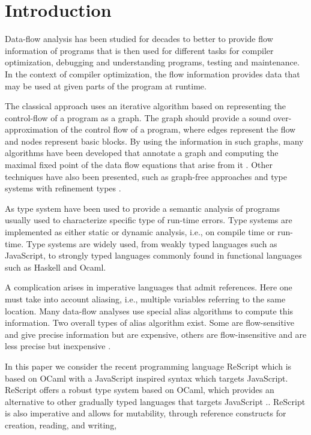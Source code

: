 \documentclass[acmsmall,sigplan]{acmart}
\begin{document}
   
	
\section{Introduction}

Data-flow analysis has been studied for decades to better to provide
flow information of programs that is then used for
different tasks for compiler optimization, debugging and understanding
programs, testing and maintenance.  In the context of compiler
optimization, the flow information provides data that may be
used at given parts of the program at runtime.

The classical approach uses an iterative algorithm based on
representing the control-flow of a program as a graph.  The graph
should provide a sound over-approximation of the control flow of a
program, where edges represent the flow and nodes represent basic
blocks.  By using the information in such graphs, many algorithms have
been developed that annotate a graph and computing the maximal fixed
point of the data flow equations that arise from it
\cite{KildallGaryA1973Auat, RyderBarbara1988Idaa}.  Other techniques
have also been presented, such as graph-free approaches
\cite{HorspoolR.Niegel2002AGAt} and type systems with refinement types
\cite{PavlinovicZvonimir2021Dfrt}.

As type system have been used to provide a semantic analysis of
programs usually used to characterize specific type of run-time
errors. Type systems are implemented as either static or dynamic
analysis, i.e., on compile time or run-time.  Type systems are widely
used, from weakly typed languages such as JavaScript, to strongly
typed languages commonly found in functional languages such as Haskell
and Ocaml.

A complication arises in imperative languages that admit
references. Here one must take into account aliasing, i.e., multiple
variables referring to the same location.  Many data-flow analyses use
special alias algorithms to compute this information.  Two overall
types of alias algorithm exist. Some are flow-sensitive and give
precise information but are expensive, others are flow-insensitive and
are less precise but inexpensive \cite{LiangDonglin1999Eaag,
  EmamiMaryam1994Cipa}.

In this paper we consider the recent programming language ReScript
which is based on OCaml with a JavaScript inspired syntax which
targets JavaScript.  ReScript offers a robust type system based on
OCaml, which provides an alternative to other gradually typed
languages that targets JavaScript .\cite{rescript_rebrand}. ReScript
is also imperative and allows for mutability, through reference
constructs for creation, reading, and writing,
\end{document}
